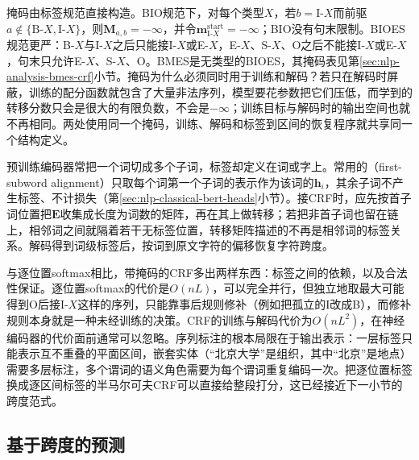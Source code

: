 掩码由标签规范直接构造。BIO规范下，对每个类型$X$，若$b=\mathrm{I}\text{-}X$而前驱$a\notin\{\mathrm B\text{-}X,\mathrm I\text{-}X\}$，则$\bm M_{a,b}=-\infty$，并令$\bm m^{\mathrm{start}}_{\mathrm I\text{-}X}=-\infty$；BIO没有句末限制。BIOES规范更严：B-$X$与I-$X$之后只能接I-$X$或E-$X$，E-$X$、S-$X$、O之后不能接I-$X$或E-$X$，句末只允许E-$X$、S-$X$、O。BMES是无类型的BIOES，其掩码表见第\ref{sec:nlp-analysis-bmes-crf}小节。掩码为什么必须同时用于训练和解码？若只在解码时屏蔽，训练的配分函数就包含了大量非法序列，模型要花参数把它们压低，而学到的转移分数只会是很大的有限负数，不会是$-\infty$；训练目标与解码时的输出空间也就不再相同。两处使用同一个掩码，训练、解码和标签到区间的恢复程序就共享同一个结构定义。

预训练编码器常把一个词切成多个子词，标签却定义在词或字上。常用的（first-subword alignment）只取每个词第一个子词的表示作为该词的$\bm h_i$，其余子词不产生标签、不计损失（第\ref{sec:nlp-classical-bert-heads}小节）。接CRF时，应先按首子词位置把$\bm E$收集成长度为词数的矩阵，再在其上做转移；若把非首子词也留在链上，相邻词之间就隔着若干无标签位置，转移矩阵描述的不再是相邻词的标签关系。解码得到词级标签后，按词到原文字符的偏移恢复字符跨度。

与逐位置softmax相比，带掩码的CRF多出两样东西：标签之间的依赖，以及合法性保证。逐位置softmax的代价是$O(nL)$，可以完全并行，但独立地取最大可能得到O后接I-$X$这样的序列，只能靠事后规则修补（例如把孤立的I改成B），而修补规则本身就是一种未经训练的决策。CRF的训练与解码代价为$O(nL^2)$，在神经编码器的代价面前通常可以忽略。序列标注的根本局限在于输出表示：一层标签只能表示互不重叠的平面区间，嵌套实体（“北京大学”是组织，其中“北京”是地点）需要多层标注，多个谓词的语义角色需要为每个谓词重复编码一次。把逐位置标签换成逐区间标签的半马尔可夫CRF可以直接给整段打分，这已经接近下一小节的跨度范式。

\subsection{基于跨度的预测}
\label{sec:nlp-analysis-paradigm-span}

